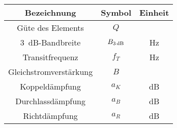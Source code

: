 \begin{center}
\begin{tabular}{ccc} \toprule
Bezeichnung & Symbol & Einheit \\ \midrule
Güte des Elements & $Q$ & \\
\SI{3}{\dB}-Bandbreite & $B_\text{\SI{3}{\dB}}$ & \si{\hertz} \\
Transitfrequenz & $f_T$ & \si{\hertz} \\
Gleichstromverstärkung & $B$ & \\
Koppeldämpfung & $a_K$ & \si{\dB} \\
Durchlassdämpfung & $a_B$ & \si{\dB} \\
Richtdämpfung & $a_R$ & \si{\dB} \\
\bottomrule
\end{tabular}
\end{center}
